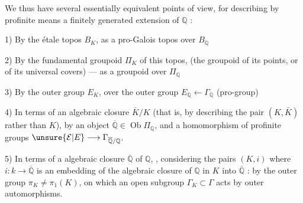 We thus have several essentially equivalent points of view, for describing by profinite means a finitely generated extension  of $\mathbb Q$ :

1) By the étale topos $B_K$, as a pro-Galois topos over $B_{\mathbb Q}$

2) By the fundamental groupoid $\Pi_K$ of this topos, (the groupoid of its points, or of its universal covers) --- as a groupoid over $\Pi_{\mathbb Q}$

 3) By the outer group $E_K$, over the outer group $E_{\mathbb Q}\longleftarrow\Gamma_{\mathbb Q}$ (pro-group)

4) In terms of an algebraic closure $\bar K/K$ (that is, by describing the pair $(K,\bar K)$ rather than $K$), by an object $\overline{\mathbb Q}\in\operatorname{Ob}\Pi_{\mathbb Q}$, and a homomorphism of profinite groups $\unsure{\mathcal E|E}\longrightarrow\Gamma_{\overline{\mathbb Q}/\mathbb Q}$.

5) In terms of a  algebraic closure $\overline{\mathbb Q}$ of $\mathbb Q$, ,  considering the pairs $(K,i)$ where $i:k\longrightarrow\overline{\mathbb Q}$ is an embedding of the algebraic closure of $\mathbb Q$ in $K$ into $\overline{\mathbb Q}$ :  by the outer group $\pi_K\neq\pi_1(K)$, on which an open subgroup $\Gamma_K\subset\Gamma$ acts by outer automorphisms.

